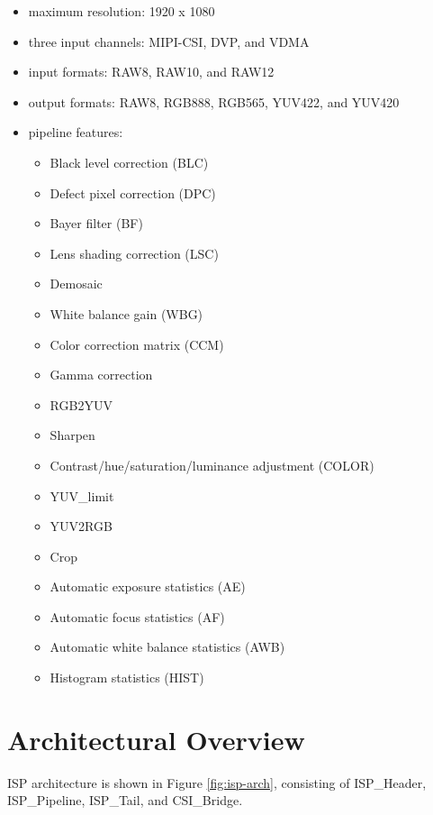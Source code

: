 \documentclass[main\_\_EN.tex]{subfiles}
\begin{document}
\begin{itemize}
    \item maximum resolution: 1920 x 1080
    \item three input channels: MIPI-CSI, DVP, and VDMA
    \item input formats: RAW8, RAW10, and RAW12
    \item output formats: RAW8, RGB888, RGB565, YUV422, and YUV420
    \item pipeline features:
        \begin{itemize}
        \item Black level correction (BLC)
        \item Defect pixel correction (DPC)
        \item Bayer filter (BF)
        \item Lens shading correction (LSC)
        \item Demosaic
        \item White balance gain (WBG)
        \item Color correction matrix (CCM)
        \item Gamma correction
        \item RGB2YUV
        \item Sharpen
        \item Contrast/hue/saturation/luminance adjustment (COLOR)
        \item YUV\_limit
        \item YUV2RGB
        \item Crop
        \item Automatic exposure statistics (AE)
        \item Automatic focus statistics (AF)
        \item Automatic white balance statistics (AWB)
        \item Histogram statistics (HIST)
        \end{itemize}
\end{itemize}



\section{Architectural Overview}
\label{sec:isp-arch-overview}

ISP architecture is shown in Figure \ref{fig:isp-arch}, consisting of ISP\_Header, ISP\_Pipeline, ISP\_Tail, and CSI\_Bridge.
\end{document}

